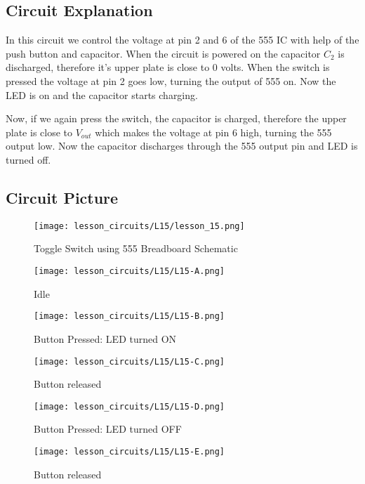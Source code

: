 \subsection{Circuit Explanation}
In this circuit we control the voltage at pin 2 and 6 of the 555 IC with help of the push button and capacitor. When the circuit is 
powered on the capacitor $C_2$ is discharged, therefore it's upper plate is close to 0 volts. When the switch is pressed the voltage 
at pin 2 goes low, turning the output of 555 on. Now the LED is on and the capacitor starts charging.

Now, if we again press the switch, the capacitor is charged, therefore the upper plate is close to $V_{out}$ which makes the voltage 
at pin 6 high, turning the 555 output low. Now the capacitor discharges through the 555 output pin and LED is turned off.
\subsection{Circuit Picture}
\begin{figure}[!htp]
    \centering
    \texttt{[image: lesson\_circuits/L15/lesson\_15.png]}
    \caption{Toggle Switch using 555 Breadboard Schematic}
    \label{fig:555_ts_sch}
\end{figure}
\begin{figure}[!htp]
    \centering
    \texttt{[image: lesson\_circuits/L15/L15-A.png]}
    \caption{Idle}
    \label{fig:555_ts_obb}
\end{figure}
\begin{figure}[!htp]
    \centering
    \texttt{[image: lesson\_circuits/L15/L15-B.png]}
    \caption{Button Pressed: LED turned ON}
    \label{fig:555_ts_obb1}
\end{figure}
\begin{figure}[!htp]
    \centering
    \texttt{[image: lesson\_circuits/L15/L15-C.png]}
    \caption{Button released}
    \label{fig:555_ts_obb2}
\end{figure}
\begin{figure}[!htp]
    \centering
    \texttt{[image: lesson\_circuits/L15/L15-D.png]}
    \caption{Button Pressed: LED turned OFF}
    \label{fig:555_ts_obb3}
\end{figure}
\begin{figure}[!htp]
    \centering
    \texttt{[image: lesson\_circuits/L15/L15-E.png]}
    \caption{Button released}
    \label{fig:555_ts_obb4}
\end{figure}
\clearpage
